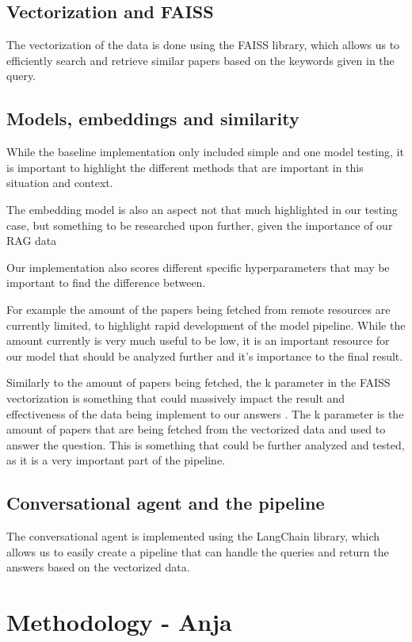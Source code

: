 \documentclass[fleqn,moreauthors,10pt]{ds_report}
\begin{document}
\subsection*{Vectorization and FAISS}
The vectorization of the data is done using the FAISS library, which allows us to efficiently search and retrieve similar papers based on the keywords given in the query.

\subsection*{Models, embeddings and similarity}

While the baseline implementation only included simple and one model testing, it is important to highlight the different methods that are important in this situation and context.

The embedding model is also an aspect not that much highlighted in our testing case, but something to be researched upon further, given the importance of our RAG data

Our implementation also scores different specific hyperparameters that may be important to find the difference between.

For example the amount of the papers being fetched from remote resources are currently limited, to highlight rapid development of the model pipeline. While the amount currently is very much useful to be low, it is an important resource for our model that should be analyzed further and it's importance to the final result.

Similarly to the amount of papers being fetched, the k parameter in the FAISS vectorization is something that could massively impact the result and effectiveness of the data being implement to our answers . The k parameter is the amount of papers that are being fetched from the vectorized data and used to answer the question. This is something that could be further analyzed and tested, as it is a very important part of the pipeline.

\subsection*{Conversational agent and the pipeline}
The conversational agent is implemented using the LangChain library, which allows us to easily create a pipeline that can handle the queries and return the answers based on the vectorized data.

\section*{Methodology - Anja}
\end{document}
